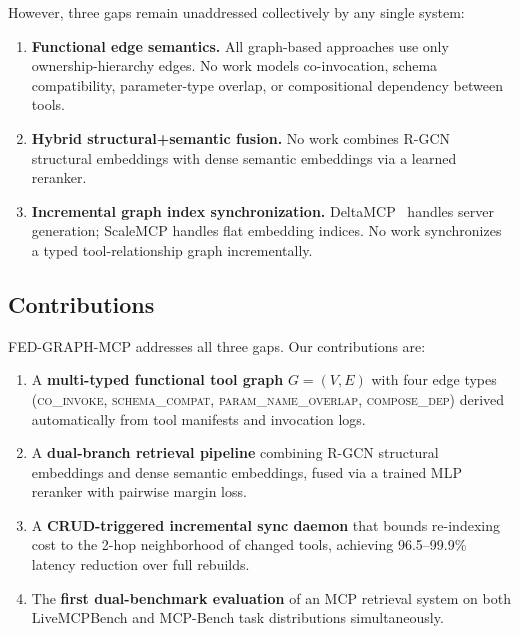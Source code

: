 \documentclass[conference]{IEEEtran}
\begin{document}
However, three gaps remain unaddressed collectively by any single
system:

\begin{enumerate}
    \item \textbf{Functional edge semantics.} All graph-based
    approaches use only ownership-hierarchy edges. No work models
    co-invocation, schema compatibility, parameter-type overlap, or
    compositional dependency between tools.

    \item \textbf{Hybrid structural+semantic fusion.} No work
    combines R-GCN structural embeddings with dense semantic
    embeddings via a learned reranker.

    \item \textbf{Incremental graph index synchronization.}
    DeltaMCP~\cite{deltamcp2026} handles server generation;
    ScaleMCP handles flat embedding indices. No work synchronizes a
    typed tool-relationship graph incrementally.
\end{enumerate}

\subsection{Contributions}

FED-GRAPH-MCP addresses all three gaps. Our contributions are:

\begin{enumerate}
    \item A \textbf{multi-typed functional tool graph}
    $G = (V, E)$ with four edge types
    (\textsc{co\_invoke}, \textsc{schema\_compat},
    \textsc{param\_name\_overlap}, \textsc{compose\_dep})
    derived automatically from tool manifests and invocation logs.

    \item A \textbf{dual-branch retrieval pipeline} combining R-GCN
    structural embeddings and dense semantic embeddings, fused via a
    trained MLP reranker with pairwise margin loss.

    \item A \textbf{CRUD-triggered incremental sync daemon} that
    bounds re-indexing cost to the 2-hop neighborhood of changed
    tools, achieving 96.5--99.9\% latency reduction over full
    rebuilds.

    \item The \textbf{first dual-benchmark evaluation} of an MCP
    retrieval system on both LiveMCPBench and MCP-Bench task
    distributions simultaneously.
\end{enumerate}
\end{document}
